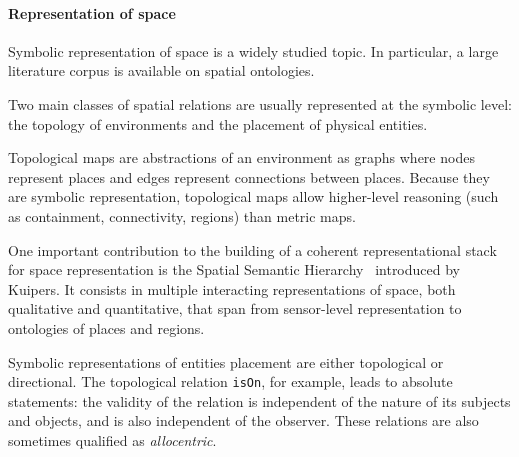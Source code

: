 \documentclass[a4paper, twocolumn]{article}
\newcommand{\concept}[1]{{\footnotesize \texttt{#1}}}
\begin{document}
\begin{scriptsize}
\begin{center}
\end{center}
\end{scriptsize}


\paragraph{Representation of space}

Symbolic representation of space is a widely studied topic. In particular, a
large literature corpus is available on spatial ontologies.

Two main classes of spatial relations are usually represented at the symbolic
level: the topology of environments and the placement of physical entities.

\begin{scriptsize}
\begin{center}
\end{center}
\end{scriptsize}

Topological maps are abstractions of an environment as graphs where nodes
represent places and edges represent connections between places. Because they
are symbolic representation, topological maps allow higher-level reasoning
(such as containment, connectivity, regions) than metric maps.

One important contribution to the building of a coherent representational stack
for space representation is the Spatial Semantic Hierarchy~\cite{Kuipers2000}
introduced by Kuipers. It consists in multiple interacting representations of
space, both qualitative and quantitative, that span from sensor-level
representation to ontologies of places and regions.

Symbolic representations of entities placement are either topological or
directional. The topological relation \concept{isOn}, for example, leads to
absolute statements: the validity of the relation is independent of the nature
of its subjects and objects, and is also independent of the observer. These
relations are also sometimes qualified as \emph{allocentric}.
\end{document}
